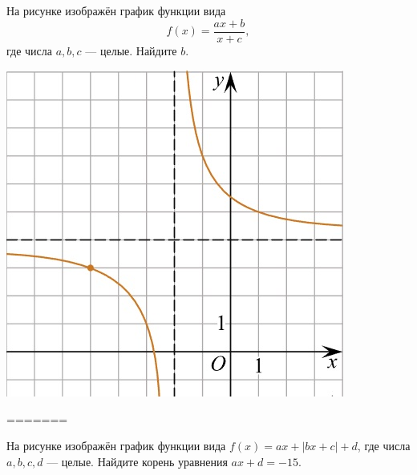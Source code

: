 \begin{class}[number=6]
\begin{listofex}
\begin{minipage}[t]{\picwidth}
	\end{minipage}
	\item
	\begin{minipage}[t]{\bodywidth}
		На рисунке изображён график функции вида \[ f(x)=\dfrac{ax+b}{x+c}, \] где числа \(a, b, c\) --- целые. Найдите \(b\).
	\end{minipage}
	\hspace{0.02\linewidth}
	\begin{minipage}[t]{\picwidth}
		\includegraphics[align=t, width=\linewidth]{pics/G101M4C6-5.jpg}
	\end{minipage}
\end{listofex}
=======
		\item
		\begin{minipage}[t]{0.43\textwidth}
			На рисунке изображён график функции вида \(f(x)=ax+|bx+c|+d\), где числа \(a, b, c, d\) --- целые. Найдите корень уравнения \(ax+d=-15\).
		\end{minipage}
		\begin{minipage}[c]{0.1\textwidth}

\end{minipage}
\end{class}
